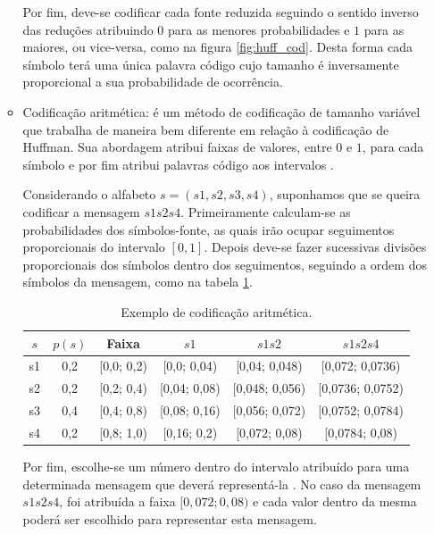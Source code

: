\begin{enumerate}
\begin{itemize}
Por fim, deve-se codificar cada fonte reduzida seguindo o sentido inverso das reduções atribuindo $ 0 $ para as menores probabilidades e $ 1 $ para as maiores, ou vice-versa, como na figura \ref{fig:huff_cod}. Desta forma cada símbolo terá uma única palavra código cujo tamanho é inversamente proporcional a sua probabilidade de ocorrência.

\item Codificação aritmética: é um método de codificação de tamanho variável que trabalha de maneira bem diferente em relação à codificação de Huffman. Sua abordagem atribui faixas de valores, entre $ 0 $ e $ 1 $, para cada símbolo e por fim atribui palavras código aos intervalos \cite{Bhaskaran:1997:IVC:549617}.

Considerando o alfabeto $ s = (s1,s2,s3,s4) $, suponhamos que se queira codificar a mensagem $ s1s2s4$. Primeiramente calculam-se as probabilidades dos símbolos-fonte, as quais irão ocupar seguimentos proporcionais do intervalo $[0, 1]$. Depois deve-se fazer sucessivas divisões proporcionais dos símbolos dentro dos seguimentos, seguindo a ordem dos símbolos da mensagem, como na tabela \ref{arit_cod}.

\begin{table}[!ht]
\centering
\begin{tabular}{|c|c|c|c|c|c|}
\hline
$ s $ & $ p(s) $ & Faixa & $ s1$ & $ s1s2 $             & $ s1s2s4 $             \\ \hline 
s1            & 0,2           & {[}0,0; 0,2)         & {[}0,0; 0,04)  & {[}0,04;  0,048) & {[}0,072; 0,0736)   \\ \hline
s2            & 0,2           & {[}0,2; 0,4)         & {[}0,04; 0,08) & {[}0,048; 0,056) & {[}0,0736; 0,0752) \\ \hline
s3            & 0,4           & {[}0,4; 0,8)         & {[}0,08; 0,16) & {[}0,056; 0,072) & {[}0,0752; 0,0784) \\ \hline
s4            & 0,2           & {[}0,8; 1,0)         & {[}0,16; 0,2)  & {[}0,072; 0,08)  & {[}0,0784; 0,08)    \\ \hline
\end{tabular}
\caption{Exemplo de codificação aritmética.}
\label{arit_cod}
\end{table}

Por fim, escolhe-se um número dentro do intervalo atribuído para uma determinada mensagem que deverá representá-la	. No caso da mensagem $ s1s2s4 $,  foi atribuída a faixa $ [0,072; 0,08) $ e cada valor dentro da mesma poderá ser escolhido para representar esta mensagem.


\end{itemize}
\end{enumerate}
